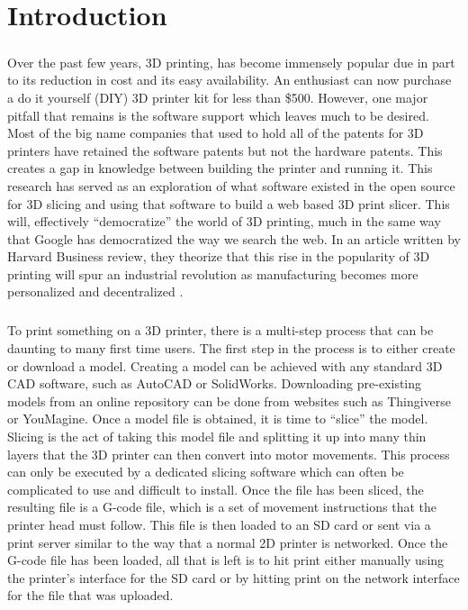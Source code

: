 \chapter{Introduction}
\paragraph{}
Over the past few years, 3D printing, has become immensely popular due in part to its reduction in cost and its easy availability.
An enthusiast can now purchase a do it yourself (DIY) 3D printer kit for less than \$500.
However, one major pitfall that remains is the software support which leaves much to be desired.
Most of the big name companies that used to hold all of the patents for 3D printers have retained the software patents but not the hardware patents. 
This creates a gap in knowledge between building the printer and running it.
This research has served as an exploration of what software existed in the open source for 3D slicing and using that software to build a web based 3D print slicer.
This will, effectively “democratize” the world of 3D printing, much in the same way that Google has democratized the way we search the web. 
In an article written by Harvard Business review, they theorize that this rise in the popularity of 3D printing will spur an industrial revolution as manufacturing becomes more personalized and decentralized \citep{daveni-2015}.

\paragraph{}
To print something on a 3D printer, there is a multi-step process that can be daunting to many first time users. 
The first step in the process is to either create or download a model.
Creating a model can be achieved with any standard 3D CAD software, such as AutoCAD or SolidWorks.
Downloading pre-existing models from an online repository can be done from websites such as Thingiverse or YouMagine.
Once a model file is obtained, it is time to “slice” the model.
Slicing is the act of taking this model file and splitting it up into many thin layers that the 3D printer can then convert into motor movements.
This process can only be executed by a dedicated slicing software which can often be complicated to use and difficult to install.
Once the file has been sliced, the resulting file is a G-code file, which is a set of movement instructions that the printer head must follow.
This file is then loaded to an SD card or sent via a print server similar to the way that a normal 2D printer is networked.
Once the G-code file has been loaded, all that is left is to hit print either manually using the printer's interface for the SD card or by hitting print on the network interface for the file that was uploaded.

